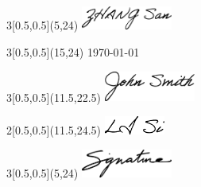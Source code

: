\documentclass[a4paper]{article} %
\begin{document}

\begin{textblock}{3}[0.5,0.5](5,24)
\includegraphics[width=3cm]{signature/zhangsan.pdf}
\end{textblock}

\begin{textblock}{3}[0.5,0.5](15,24)
\today
\end{textblock}


\begin{textblock}{3}[0.5,0.5](11.5,22.5)
\includegraphics[width=3cm]{signature/johnsmith.pdf}
\end{textblock}

\begin{textblock}{2}[0.5,0.5](11.5,24.5)
\includegraphics[width=2cm]{signature/lisi.pdf}
\end{textblock}

\pdfoverlayIncludeToLastPage

\begin{textblock}{3}[0.5,0.5](5,24)
\includegraphics[width=3cm]{signature/signature.pdf}
\end{textblock}
\end{document}
